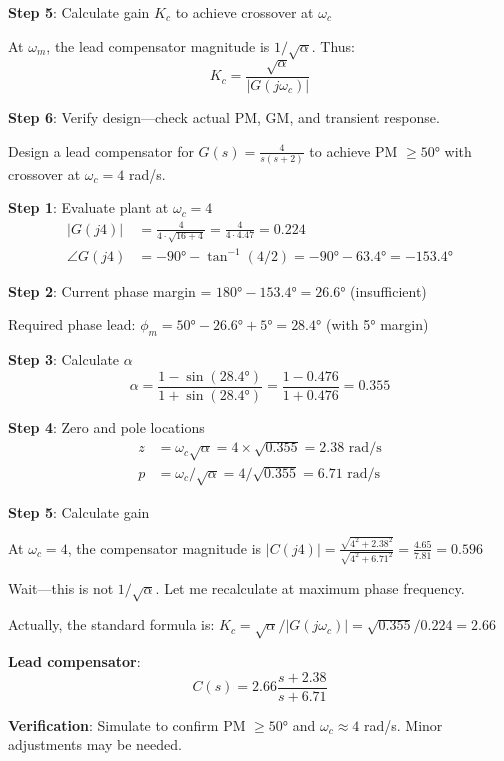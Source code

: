 \textbf{Step 5}: Calculate gain $K_c$ to achieve crossover at $\omega_c$

At $\omega_m$, the lead compensator magnitude is $1/\sqrt{\alpha}$. Thus:
\begin{equation}
K_c = \frac{\sqrt{\alpha}}{|G(j\omega_c)|}
\end{equation}

\textbf{Step 6}: Verify design---check actual PM, GM, and transient response.

\begin{example}
\label{ex:lead_design}
Design a lead compensator for $G(s) = \frac{4}{s(s+2)}$ to achieve PM $\geq 50°$ with crossover at $\omega_c = 4$ rad/s.

\textbf{Step 1}: Evaluate plant at $\omega_c = 4$
\begin{align}
|G(j4)| &= \frac{4}{4 \cdot \sqrt{16+4}} = \frac{4}{4 \cdot 4.47} = 0.224 \\
\angle G(j4) &= -90° - \tan^{-1}(4/2) = -90° - 63.4° = -153.4°
\end{align}

\textbf{Step 2}: Current phase margin = $180° - 153.4° = 26.6°$ (insufficient)

Required phase lead: $\phi_m = 50° - 26.6° + 5° = 28.4°$ (with 5° margin)

\textbf{Step 3}: Calculate $\alpha$
\begin{equation}
\alpha = \frac{1 - \sin(28.4°)}{1 + \sin(28.4°)} = \frac{1 - 0.476}{1 + 0.476} = 0.355
\end{equation}

\textbf{Step 4}: Zero and pole locations
\begin{align}
z &= \omega_c \sqrt{\alpha} = 4 \times \sqrt{0.355} = 2.38 \text{ rad/s} \\
p &= \omega_c / \sqrt{\alpha} = 4 / \sqrt{0.355} = 6.71 \text{ rad/s}
\end{align}

\textbf{Step 5}: Calculate gain

At $\omega_c = 4$, the compensator magnitude is $|C(j4)| = \frac{\sqrt{4^2 + 2.38^2}}{\sqrt{4^2 + 6.71^2}} = \frac{4.65}{7.81} = 0.596$

Wait---this is not $1/\sqrt{\alpha}$. Let me recalculate at maximum phase frequency.

Actually, the standard formula is: $K_c = \sqrt{\alpha} / |G(j\omega_c)| = \sqrt{0.355}/0.224 = 2.66$

\textbf{Lead compensator}:
\begin{equation}
C(s) = 2.66 \frac{s + 2.38}{s + 6.71}
\end{equation}

\textbf{Verification}: Simulate to confirm PM $\geq 50°$ and $\omega_c \approx 4$ rad/s. Minor adjustments may be needed.
\end{example}

